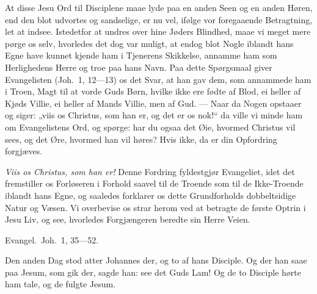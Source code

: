 \documentclass[12pt,a4paper]{book}
\begin{document}
At disse Jesu Ord til Disciplene maae lyde paa en anden Seen og en anden Høren,
end den blot udvortes og sandselige, er nu vel, ifølge vor foregaaende
Betragtning, let at indsee. Istedetfor at undres over hine Jøders Blindhed, maae
vi meget mere pørge os selv, hvorledes det dog var muligt, at endog blot Nogle
iblandt hans Egne have kunnet kjende ham i Tjenerens Skikkelse, annamme ham som
Herlighedens Herre og troe paa hans Navn. Paa dette Spørgsmaal giver Evangelisten
(Joh.\ 1, 12---13) os
{\large det Svar, at han gav dem, som annammede ham i Troen, Magt til at vorde Guds Børn,
hvilke ikke ere fødte af Blod, ei heller af Kjøds Villie, ei heller af Mands Villie, men
af Gud.} --- Naar da Nogen opstaaer og siger: „viis os Christus, som han er, og det er os
nok!“ da ville vi minde ham om Evangelistens Ord, og spørge: har du ogsaa det Øie,
hvormed Christus vil sees, og det Øre, hvormed han vil høres? Hvis ikke, da er din
Opfordring forgjæves.

\emph{Viis os Christus, som han er!} Denne Fordring fyldestgjør Evangeliet, idet det
fremstiller os Forløseren i Forhold saavel til de Troende som til de Ikke-Troende iblandt
hans Egne, og saaledes forklarer os dette Grundforholds dobbeltsidige Natur og Væsen. Vi
overbevise os strar herom ved at betragte de første Optrin i Jesu Liv, og see, hvorledes
Forgjængeren beredte sin Herre Veien.

Evangel.\ Joh.\ 1, 35---52.

\begingroup\large
Den anden Dag stod atter Johannes der, og to af hans Disciple. Og der han saae paa Jesum,
som gik der, sagde han: see det Guds Lam! Og de to Disciple hørte ham tale, og de fulgte
Jesum.
\par\endgroup
\end{document}
